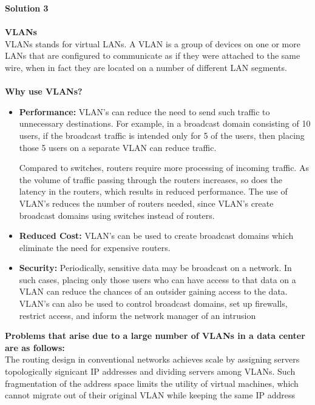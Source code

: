 \documentclass[letterpaper, 11pt]{article}
\begin{document}
\textbf{Solution 3}\\ \\
\textbf{VLANs} \\ 
VLANs stands for virtual LANs. A VLAN is a group of devices on one or more LANs that are configured to communicate as if they were attached to the same wire, when in fact they are located on a number of different LAN segments. \\ \\
\textbf{Why use VLANs?}
\begin{itemize}
\item \textbf{Performance:} VLAN's can reduce the need to send such traffic to unnecessary destinations. For example, in a broadcast domain consisting of 10 users, if the broadcast traffic is intended only for 5 of the users, then placing those 5 users on a separate VLAN can reduce traffic.

Compared to switches, routers require more processing of incoming traffic. As the volume of traffic passing through the routers increases, so does the latency in the routers, which results in reduced performance. The use of VLAN's reduces the number of routers needed, since VLAN's create broadcast domains using switches instead of routers.
\item \textbf{Reduced Cost:} VLAN's can be used to create broadcast domains which eliminate the need for expensive routers.
\item \textbf{Security:} Periodically, sensitive data may be broadcast on a network. In such cases, placing only those users who can have access to that data on a VLAN can reduce the chances of an outsider gaining access to the data. VLAN's can also be used to control broadcast domains, set up firewalls, restrict access, and inform the network manager of an intrusion
\end{itemize}
\textbf{Problems that arise due to a large number of VLANs in a data center are as follows:} \\
The routing design in conventional networks achieves scale by
assigning servers topologically signicant IP addresses and dividing
servers among VLANs. Such fragmentation of the address space
limits the utility of virtual machines, which cannot migrate out of
their original VLAN while keeping the same IP address

\bigskip
\end{document}
